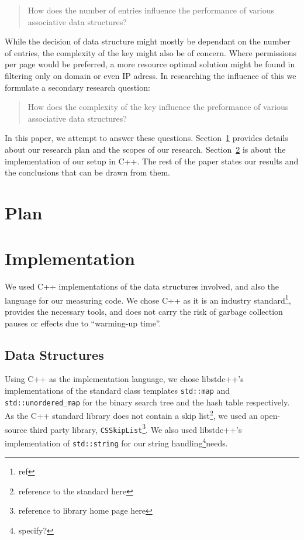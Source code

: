 \documentclass[12pt,a4paper]{article}
\begin{document}
    \begin{quotation}
        How does the number of entries influence the performance of various associative data
        structures?
    \end{quotation}

    While the decision of data structure might mostly be dependant on the number of entries, the
    complexity of the key might also be of concern. Where permissions per page would be preferred, a
    more resource optimal solution might be found in filtering only on domain or even IP adress.  In
    researching the influence of this we formulate a secondary research question:

    \begin{quotation}
        How does the complexity of the key influence the preformance of various associative data structures?
    \end{quotation}

    In this paper, we attempt to answer these questions. Section~\ref{sec:plan} provides details
    about our research plan and the scopes of our research. Section~\ref{sec:implementation} is
    about the implementation of our setup in C++.  The rest of the paper states our results and the
    conclusions that can be drawn from them.

    \section{Plan}
    \label{sec:plan}

    \section{Implementation}
    \label{sec:implementation}

    We used C++ implementations of the data structures involved, and also the language for our
    measuring code.  We chose C++ as it is an industry standard\footnote{ref}, provides the
    necessary tools, and does not carry the risk of garbage collection pauses or effects due to
    ``warming-up time''.

    \subsection*{Data Structures}

    Using C++ as the implementation language, we chose libstdc++'s implementations of the standard class
    templates \texttt{std::map} and \texttt{std::unordered\_map} for the binary search
    tree and the hash table respectively.  As the C++ standard library does not contain a skip
    list\footnote{reference to the standard here}, we used an open-source third party library,
    \texttt{CSSkipList}\footnote{reference to library home page here}.  We also used libstdc++'s
    implementation of \texttt{std::string} for our string handling\footnote{specify?}needs.
\end{document}
